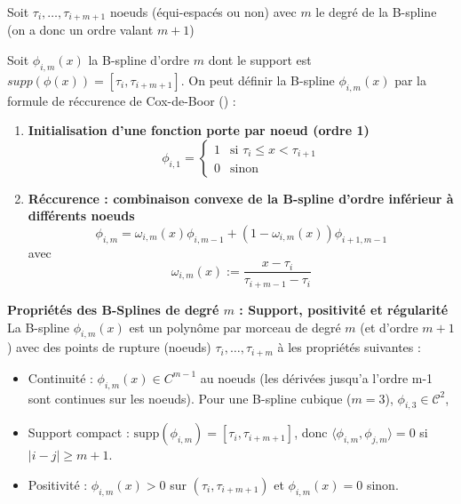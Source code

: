 \documentclass{article}
\begin{document}
	
	Soit $\tau_i, \ldots, \tau_{i+m+1}$ noeuds (équi-espacés ou non) avec $m$ le degré de la B-spline (on a donc un ordre valant $m+1$) 
	
	Soit $\phi_{i,m}(x)$ la B-spline d'ordre $m$ dont le support est $supp(\phi(x)) = [\tau_i, \tau_{i+m+1}]$. On peut définir la B-spline $\phi_{i,m}(x)$ par la formule de réccurence de Cox-de-Boor (\cite{deBoor}) : 
	\begin{enumerate}
		\item \textbf{Initialisation d'une fonction porte par noeud (ordre 1)}
		\begin{equation}
			\phi_{i,1} = \begin{cases}
				1 & \text{si } \tau_i \leq x < \tau_{i+1} \\
				0 & \text{sinon}
			\end{cases}
		\end{equation}
		
		\item \textbf{Réccurence : combinaison convexe de la B-spline d'ordre inférieur à différents noeuds}
		\begin{equation}
			\phi_{i, m} = \omega_{i,m}(x) \phi_{i, m-1} + (1 - \omega_{i,m}(x)) \phi_{i+1, m-1}
		\end{equation}
		avec 
		\begin{equation}
			\omega_{i,m}(x) := \frac{x - \tau_i}{\tau_{i+m-1}- \tau_i}
		\end{equation}
	\end{enumerate}
	
	\textbf{Propriétés des B-Splines de degré $m$ : Support, positivité et régularité}
	La B-spline $\phi_{i, m}(x)$ est un polynôme par morceau de degré $m$ (et d'ordre $m+1$) avec des points de rupture (noeuds) $\tau_i, \ldots, \tau_{i+m} $ à les propriétés suivantes :
	\begin{itemize}
		\item Continuité : $\phi_{i, m}(x) \in C^{m-1}$ au noeuds (les dérivées jusqu'a l'ordre m-1 sont continues sur les noeuds). Pour une B-spline cubique ($m=3$), $\phi_{i, 3} \in \mathcal{C}^{2}$,
		\item Support compact : $\text{supp}(\phi_{i,m}) = [\tau_i, \tau_{i+m+1}]$, 
		donc $\langle \phi_{i,m}, \phi_{j,m} \rangle = 0$ si $|i-j| \geq m+1$.
		\item Positivité : $\phi_{i,m}(x) > 0$ sur $(\tau_i, \tau_{i+m+1})$ 
		et $\phi_{i,m}(x) = 0$ sinon.
	\end{itemize}
	
	
\end{document}
